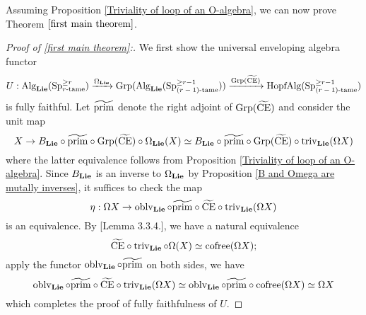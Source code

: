 Assuming Proposition \ref{Triviality of loop of an O-algebra}, we can now prove Theorem $\ref{first main theorem}$.
\begin{proof}
[Proof of  \ref{first main theorem}:]
	We first show the universal enveloping algebra functor
	\[
	U:
	\operatorname{Alg}_{\mathbf{Lie}}(\operatorname{Sp}^{\geq r}_{\text{$r$-tame}}) 
	\xrightarrow{\Omega_{\mathbf{Lie}}}
	\operatorname{Grp}(\operatorname{Alg}_{\mathbf{Lie}}(\operatorname{Sp}^{\geq r-1}_{\text{($r-1$)-tame}}))
	\xrightarrow{\operatorname{Grp}(\widetilde{\operatorname{CE}})}
	\operatorname{HopfAlg}(\operatorname{Sp}^{\geq r-1}_{\text{($r-1$)-tame}})
	\]
	is fully faithful. 
    Let $\widetilde{\operatorname{prim}}$ denote the right adjoint of $\operatorname{Grp}(\widetilde{\operatorname{CE}})$ and consider the unit map
	$$
	X \to B_{\mathbf{Lie}}\circ \widetilde{\operatorname{prim}} \circ \operatorname{Grp}(\widetilde{\operatorname{CE}})\circ \Omega_{\mathbf{Lie}}(X)
	\simeq
	B_{\mathbf{Lie}}\circ
	\widetilde{\operatorname{prim}} \circ\operatorname{Grp}(\widetilde{\operatorname{CE}} ) \circ \operatorname{triv}_{\mathbf{Lie}}(\Omega X)
	$$
where the latter equivalence follows from Proposition \ref{Triviality of loop of an O-algebra}. Since $B_{\mathbf{Lie}}$ is an inverse to $\Omega_{\mathbf{Lie}}$ by Proposition \ref{B and Omega are mutally inverses}, it suffices to check the map
\[
\eta:  \Omega X \to 
\operatorname{oblv}_{\mathbf{Lie}}\circ 
\widetilde{\operatorname{prim}} \circ \widetilde{\operatorname{CE}}\circ \operatorname{triv}_{\mathbf{Lie}}(\Omega X)
\]
is an equivalence.
%	
	By \cite{Francis-Gaitsgory}[Lemma 3.3.4.], we have a natural equivalence 
	$$\widetilde{\operatorname{CE}}\circ \operatorname{triv}_{\mathbf{Lie}}\circ \Omega (X) 
	\simeq 
	\operatorname{cofree}(\Omega X);
	$$ 
	apply the functor $\operatorname{oblv}_{\mathbf{Lie}} \circ \widetilde{\operatorname{prim}}$ on both sides, we have
	$$
	\operatorname{oblv}_{\mathbf{Lie}} \circ \widetilde{\operatorname{prim}}\circ \widetilde{\operatorname{CE}} \circ 
	\operatorname{triv}_{\mathbf{Lie}}(\Omega X) \simeq   	\operatorname{oblv}_{\mathbf{Lie}} \circ \widetilde{\operatorname{prim}}\circ \operatorname{cofree}(\Omega X)
	\simeq  \Omega X
	$$
	which completes the proof of fully faithfulness of $U$.


\end{proof}
